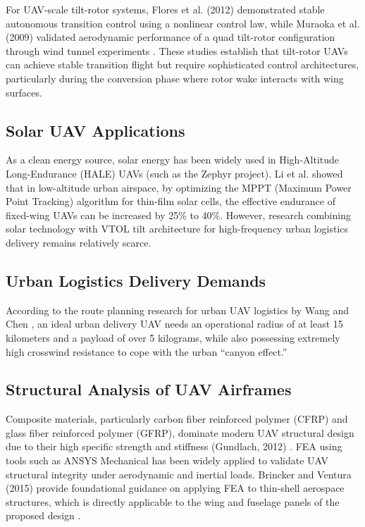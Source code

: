 \documentclass[conference]{IEEEtran}
\begin{document}
For UAV-scale tilt-rotor systems, Flores et al. (2012) demonstrated stable autonomous transition control using a nonlinear control law, while Muraoka et al. (2009) validated aerodynamic performance of a quad tilt-rotor configuration through wind tunnel experiments \cite{b1}. These studies establish that tilt-rotor UAVs can achieve stable transition flight but require sophisticated control architectures, particularly during the conversion phase where rotor wake interacts with wing surfaces.


\subsection{Solar UAV Applications}
As a clean energy source, solar energy has been widely used in High-Altitude Long-Endurance (HALE) UAVs (such as the Zephyr project). Li et al. \cite{b2} showed that in low-altitude urban airspace, by optimizing the MPPT (Maximum Power Point Tracking) algorithm for thin-film solar cells, the effective endurance of fixed-wing UAVs can be increased by 25\% to 40\%. However, research combining solar technology with VTOL tilt architecture for high-frequency urban logistics delivery remains relatively scarce.

\subsection{Urban Logistics Delivery Demands}
According to the route planning research for urban UAV logistics by Wang and Chen \cite{b3}, an ideal urban delivery UAV needs an operational radius of at least 15 kilometers and a payload of over 5 kilograms, while also possessing extremely high crosswind resistance to cope with the urban ``canyon effect.''

\subsection{Structural Analysis of UAV Airframes}\label{SAUA}

Composite materials, particularly carbon fiber reinforced polymer (CFRP) and glass fiber reinforced polymer (GFRP), dominate modern UAV structural design due to their high specific strength and stiffness (Gundlach, 2012) \cite{b7}. FEA using tools such as ANSYS Mechanical has been widely applied to validate UAV structural integrity under aerodynamic and inertial loads. Brincker and Ventura (2015) provide foundational guidance on applying FEA to thin-shell aerospace structures, which is directly applicable to the wing and fuselage panels of the proposed design \cite{b8}.
\end{document}
